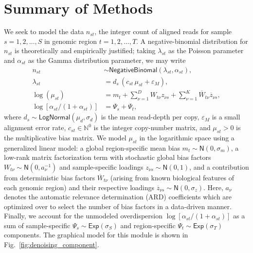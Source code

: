 \documentclass[sigplan]{acmart}\settopmatter{printfolios=true,printccs=false,printacmref=false}
\begin{document}
\section{Summary of Methods}\label{sec:methods}
 We seek to model the data $n_{st}$, the integer count of aligned reads for sample $s=1, 2, \ldots, S$ in genomic region $t=1, 2, \ldots, T$.  A negative-binomial distribution for $n_{st}$ is theoretically and empirically justified; taking $\lambda_{st}$ as the Poisson parameter and $\alpha_{st}$ as the Gamma distribution parameter, we may write
\begin{equation}
\begin{split}
n_{st} &\sim \mathsf{NegativeBinomal}(\lambda_{st}, \alpha_{st}),\\
\lambda_{st} &=d_s \, (c_{st} \, \mu_{st}  + \varepsilon_M),\\
\log(\mu_{st}) &= m_t + \sum_{\nu=1}^{D} W_{t\nu} z_{\nu s} + \sum_{\nu=1}^{K} \overline{W}_{t\nu} \overline{z}_{\nu s},\\
\log[\alpha_{st}/(1+ \alpha_{st})] &=\Psi_s + \Psi_t,
\end{split}
\end{equation}
where $d_s \sim \mathsf{LogNormal}(\mu_d, \sigma_d)$ is the mean read-depth per copy, $\varepsilon_M$ is a small alignment error rate, $c_{st} \in \mathbb{N}^0$ is the integer copy-number matrix, and $\mu_{st} > 0$ is the multiplicative bias matrix. We model $\mu_{st}$ in the logarithmic space using a generalized linear model: a global region-specific mean bias $m_t \sim \mathsf{N}(0, \sigma_m)$, a low-rank matrix factorization term with stochastic global bias factors $W_{t\nu} \sim \mathsf{N}(0, a_\nu^{-1})$ and sample-specific loadings $z_{\nu s} \sim \mathsf{N}(0, 1)$, and a contribution from deterministic bias factors $\overline{W}_{t\nu}$ (arising from known biological features of each genomic region) and their respective loadings $\overline{z}_{\nu s} \sim \mathsf{N}(0, \sigma_z)$. Here, $a_\nu$ denotes the automatic relevance determination (ARD) coefficients which are optimized over to select the number of bias factors in a data-driven manner. Finally, we account for the unmodeled overdispersion $\log[\alpha_{st}/(1+ \alpha_{st})]$ as a sum of sample-specific $\Psi_s \sim \mathsf{Exp}(\sigma_S)$ and region-specific $\Psi_t \sim \mathsf{Exp}(\sigma_T)$ components. The graphical model for this module is shown in Fig.~\ref{fig:denoising_component}.\\
\end{document}
